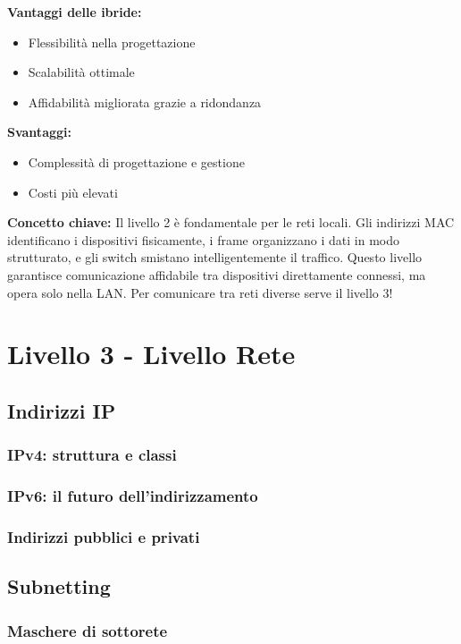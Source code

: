 \documentclass[12pt,a4paper]{article}
\begin{document}
\textbf{Vantaggi delle ibride:}
\begin{itemize}
    \item Flessibilità nella progettazione
    \item Scalabilità ottimale
    \item Affidabilità migliorata grazie a ridondanza
\end{itemize}

\textbf{Svantaggi:}
\begin{itemize}
    \item Complessità di progettazione e gestione
    \item Costi più elevati
\end{itemize}

\vspace{0.5cm}
\noindent
\textbf{Concetto chiave:} Il livello 2 è fondamentale per le reti locali. Gli indirizzi MAC identificano i dispositivi fisicamente, i frame organizzano i dati in modo strutturato, e gli switch smistano intelligentemente il traffico. Questo livello garantisce comunicazione affidabile tra dispositivi direttamente connessi, ma opera solo nella LAN. Per comunicare tra reti diverse serve il livello 3!

\section{Livello 3 - Livello Rete}
\subsection{Indirizzi IP}
\subsubsection{IPv4: struttura e classi}
\subsubsection{IPv6: il futuro dell'indirizzamento}
\subsubsection{Indirizzi pubblici e privati}
\subsection{Subnetting}
\subsubsection{Maschere di sottorete}
\end{document}
